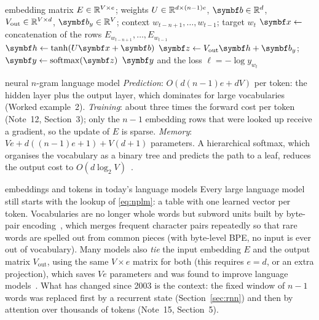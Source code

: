\documentclass[11pt]{article}
\newcommand{\hv}{\vect{h}}
\newcommand{\bv}{\vect{b}}
\newcommand{\yv}{\vect{y}}
\newcommand{\zv}{\vect{z}}
\newcommand{\softmax}{\operatorname{softmax}}
\begin{document}
\begin{algorithm}[htbp]
\caption{Neural $n$-gram language model: next-token distribution and loss}\label{alg:nplm}
\begin{algorithmic}[1]
\Require embedding matrix $E \in \mathbb{R}^{V \times e}$; weights $U \in \mathbb{R}^{d \times (n-1)e}$, $\bv \in \R^d$,
  $V_{\mathrm{out}} \in \mathbb{R}^{V \times d}$, $\bv_y \in \R^V$; context $w_{t-n+1}, \dots, w_{t-1}$; target $w_t$
  \State $\x \gets$ concatenation of the rows $E_{w_{t-n+1}}, \dots, E_{w_{t-1}}$ 
  \State $\hv \gets \tanh(U\x + \bv)$ 
  \State $\zv \gets V_{\mathrm{out}}\hv + \bv_y$; \ $\yv \gets \softmax(\zv)$ 
  \State \Return $\yv$ and the loss $\ell = -\log y_{w_t}$
\EndFunction
\end{algorithmic}
\end{algorithm}

\begin{runtime}{neural $n$-gram language model}
\emph{Prediction}: $O(d(n-1)e + dV)$ per token: the hidden layer plus the output layer, which dominates for large
vocabularies (Worked example~2). \emph{Training}: about three times the forward cost per token (Note~12, Section~3);
only the $n - 1$ embedding rows that were looked up receive a gradient, so the update of $E$ is sparse.
\emph{Memory}: $Ve + d((n-1)e + 1) + V(d + 1)$ parameters. A hierarchical softmax, which organises the vocabulary as a
binary tree and predicts the path to a leaf, reduces the output cost to $O(d\log_2 V)$~\cite{morin2005}.
\end{runtime}

\begin{modern}{embeddings and tokens in today's language models}
Every large language model still starts with the lookup of \eqref{eq:nplm}: a table with one learned vector per token.
Vocabularies are no longer whole words but subword units built by byte-pair encoding~\cite{sennrich2016}, which merges
frequent character pairs repeatedly so that rare words are spelled out from common pieces (with byte-level BPE, no input
is ever out of vocabulary). Many models also \emph{tie} the input embedding $E$ and the output matrix $V_{\mathrm{out}}$,
using the same $V \times e$ matrix for both (this requires $e = d$, or an extra projection), which saves $Ve$ parameters
and was found to improve language models~\cite{press2017}. What has changed since 2003 is the context: the fixed window
of $n - 1$ words was replaced first by a recurrent state (Section~\ref{sec:rnn}) and then by attention over thousands of
tokens (Note~15, Section~5).
\end{modern}
\end{document}
